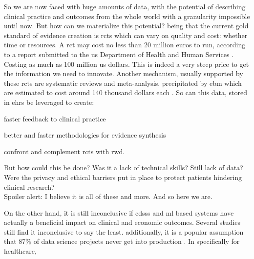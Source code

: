 So we are now faced with huge amounts of data, with the potential of describing clinical practice and outcomes from the whole world with a granularity impossible until now. But how can we materialize this potential?
being that the current gold standard of evidence creation is \acp{rct} which can vary on quality and cost: whether time or resources. A \ac{rct} may cost no less than 20 million euros to run, according to a report submitted to the \ac{us} Department of Health and Human Services \cite{sertkayaaylinEXAMINATIONCLINICALTRIAL2014}. Costing as much as 100 million \ac{us} dollars. This is indeed a very steep price to get the information we need to innovate.
Another mechanism, usually supported by these \acp{rct} are systematic reviews and meta-analysis, precipitated by \ac{ebm} which are estimated to cost around 140 thousand dollars each \cite{michelsonSignificantCostSystematic2019}.
So can this data, stored in \acp{ehr} be leveraged to create:
\begin{myitemize}
    \item faster feedback to clinical practice
    \item better and faster methodologies for evidence synthesis
    \item confront and complement \acp{rct} with \ac{rwd}.
\end{myitemize}
But how could this be done? Was it a lack of technical skills? Still lack of data? Were the privacy and ethical barriers put in place to protect patients hindering clinical research? \\
Spoiler alert: I believe it is all of these and more. And so here we are.







On the other hand, it is still inconclusive if \acp{cdss} and \ac{ml} based systems have actually a beneficial impact on clinical and economic outcomes. Several studies still find it inconclusive \cite{muhiyaddinImpactClinicalDecision2020,kilsdonkFactorsInfluencingImplementation2017,muhiyaddinImpactClinicalDecision2020} to say the least.
additionally, it is a popular assumption that 87\% of data science projects never get into production \cite{Why87Data2019}. In specifically for healthcare, 


